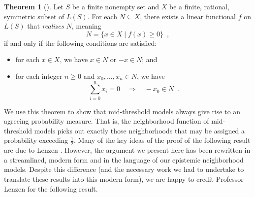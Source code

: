 \documentclass[12pt]{article}
\theoremstyle{definition}
\newtheorem{theorem}{Theorem}[section]
\begin{document}
\begin{theorem}[{\cite[Theorem 1.2]{Sco64:JMP}}]
  \label{theorem:scott}
  Let $S$ be a finite nonempty set and $X$ be a finite, rational,
  symmetric subset of $L(S)$. For each $N\subseteq X$, there exists a
  linear functional $f$ on $L(S)$ that \emph{realizes $N$}, meaning
  \[
  N = \{x\in X\mid f(x)\geq 0\}\enspace,
  \]
  if and only if the following conditions are satisfied:
  \begin{itemize}
  \item for each $x\in X$, we have $x\in N$ or $-x\in N$; and

  \item for each integer $n\geq 0$ and $x_0,\dots,x_n\in N$, we have
    \[
    \sum_{i=0}^n x_i = 0 \quad\Rightarrow\quad -x_0\in N\enspace.
    \]
  \end{itemize}
\end{theorem}

We use this theorem to show that mid-threshold models always give rise
to an agreeing probability measure.  That is, the neighborhood
function of mid-threshold models picks out exactly those neighborhoods
that may be assigned a probability exceeding $\frac 12$.  Many of the
key ideas of the proof of the following result are due to Lenzen
\cite{Lenzen1980:gwuw}. However, the argument we present here has been
rewritten in a streamlined, modern form and in the language of our
epistemic neighborhood models. Despite this difference (and the
necessary work we had to undertake to translate these results into
this modern form), we are happy to credit Professor Lenzen for the
following result.
\end{document}
